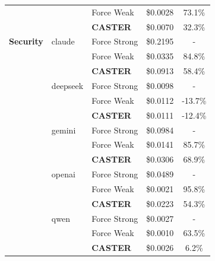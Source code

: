 \documentclass{article}
\theoremstyle{plain}
\theoremstyle{definition}
\theoremstyle{remark}
\begin{document}
\begin{table}[t]
\begin{minipage}{0.48\textwidth}
{\begin{tabular}{lllcc}
         &  & Force Weak & \$0.0028 & 73.1\% \\
         &  & \textbf{CASTER} & \$0.0070 & 32.3\% \\
        \midrule
        \textbf{Security} & claude & Force Strong& \$0.2195 & - \\
         &  & Force Weak & \$0.0335 & 84.8\% \\
         &  & \textbf{CASTER} & \$0.0913 & 58.4\% \\
         & deepseek & Force Strong& \$0.0098 & - \\
         &  & Force Weak & \$0.0112 & -13.7\% \\
         &  & \textbf{CASTER} & \$0.0111 & -12.4\% \\
         & gemini & Force Strong& \$0.0984 & - \\
         &  & Force Weak & \$0.0141 & 85.7\% \\
         &  & \textbf{CASTER} & \$0.0306 & 68.9\% \\
         & openai & Force Strong& \$0.0489 & - \\
         &  & Force Weak & \$0.0021 & 95.8\% \\
         &  & \textbf{CASTER} & \$0.0223 & 54.3\% \\
         & qwen & Force Strong& \$0.0027 & - \\
         &  & Force Weak & \$0.0010 & 63.5\% \\
         &  & \textbf{CASTER} & \$0.0026 & 6.2\% \\
            \bottomrule
        \end{tabular}%
        }
    \end{minipage}
\end{table}
\end{document}
